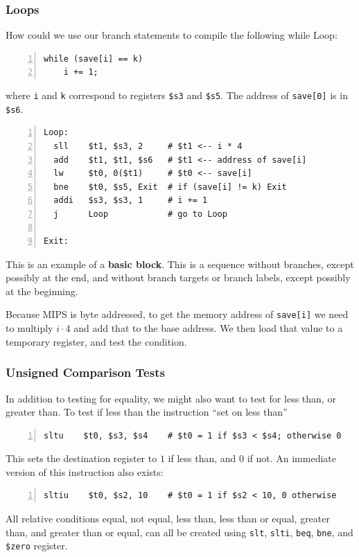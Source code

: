 \documentclass[10pt]{article}
\begin{document}
\subsubsection{Loops}
How could we use our branch statements to compile the following while Loop:
\begin{lstlisting}[style=CStyle, numbers=left, xleftmargin=5.0ex, aboveskip=2em, belowskip=2em, numberstyle=\color{blue}, escapeinside=||]
while (save[i] == k)
    i += 1;
\end{lstlisting}
where \texttt{i} and \texttt{k} correspond to registers \texttt{\$s3} and \texttt{\$s5}. The address of \texttt{save[0]} is in \texttt{\$s6}.
\begin{lstlisting}[style=CStyle, numbers=left, xleftmargin=5.0ex, aboveskip=2em, belowskip=2em, numberstyle=\color{blue}, escapeinside=||]
Loop:
  sll    $t1, $s3, 2     # $t1 <-- i * 4
  add    $t1, $t1, $s6   # $t1 <-- address of save[i]
  lw     $t0, 0($t1)     # $t0 <-- save[i]
  bne    $t0, $s5, Exit  # if (save[i] != k) Exit
  addi   $s3, $s3, 1     # i += 1
  j      Loop            # go to Loop

Exit:
\end{lstlisting}
\begin{marginfigure}
This is an example of a \textbf{basic block}.  This is a sequence without branches, except possibly at the end, and without branch targets or branch labels, except possibly at the beginning.
\end{marginfigure}%
Because MIPS is byte addressed, to get the memory address of \texttt{save[i]} we need to multiply $i \cdot 4$ and add that to the base address.  We then load that value to a temporary register, and test the condition.

\subsubsection{Unsigned Comparison Tests}
In addition to testing for equality, we might also want to test for less than, or greater than.  To test if less than the instruction ``set on less than''
\begin{lstlisting}[style=CStyle, numbers=left, xleftmargin=5.0ex, aboveskip=2em, belowskip=2em, numberstyle=\color{blue}, escapeinside=||]
  sltu    $t0, $s3, $s4    # $t0 = 1 if $s3 < $s4; otherwise 0
\end{lstlisting}
This sets the destination register to $1$ if less than, and $0$ if not.  An immediate version of this instruction also exists:
\begin{lstlisting}[style=CStyle, numbers=left, xleftmargin=5.0ex, aboveskip=2em, belowskip=2em, numberstyle=\color{blue}, escapeinside=||]
  sltiu    $t0, $s2, 10    # $t0 = 1 if $s2 < 10, 0 otherwise
\end{lstlisting}
\begin{marginfigure}
All relative conditions equal, not equal, less than, less than or equal, greater than, and greater than or equal, can all be created using \texttt{slt}, \texttt{slti}, \texttt{beq}, \texttt{bne}, and \texttt{\$zero} register.   
\end{marginfigure}%
\end{document}
